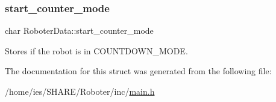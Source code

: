 \subsubsection{\texorpdfstring{start\+\_\+counter\+\_\+mode}{start\_counter\_mode}}
{\footnotesize\ttfamily char Roboter\+Data\+::start\+\_\+counter\+\_\+mode}

Stores if the robot is in C\+O\+U\+N\+T\+D\+O\+W\+N\+\_\+\+M\+O\+DE. 

The documentation for this struct was generated from the following file\+:\begin{DoxyCompactItemize}
\item 
/home/ies/\+S\+H\+A\+R\+E/\+Roboter/inc/\hyperlink{main_8h}{main.\+h}\end{DoxyCompactItemize}
